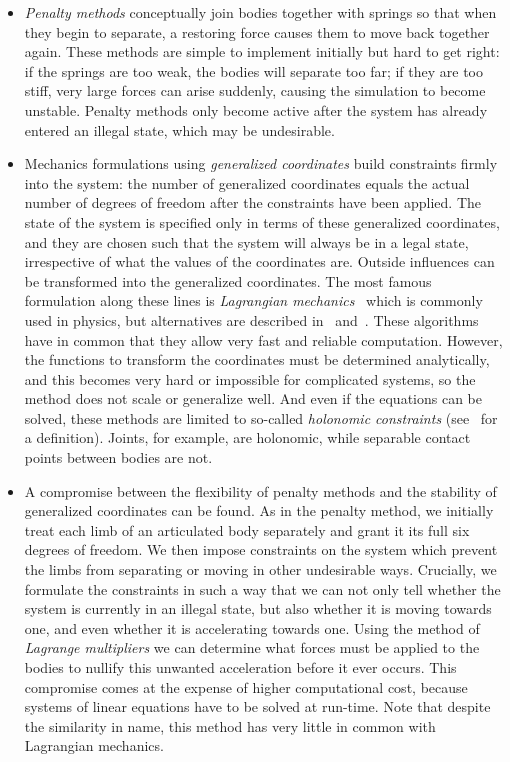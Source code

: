 \begin{itemize}
\item \emph{Penalty methods} conceptually join bodies together with springs so that when they
    begin to separate, a restoring force causes them to move back together again. These methods
    are simple to implement initially but hard to get right: if the springs are too weak, the
    bodies will separate too far; if they are too stiff, very large forces can arise suddenly,
    causing the simulation to become unstable. Penalty methods only become active after the
    system has already entered an illegal state, which may be undesirable.

\item Mechanics formulations using \emph{generalized coordinates} build constraints firmly into
    the system: the number of generalized coordinates equals the actual number of degrees of
    freedom after the constraints have been applied. The state of the system is specified only in
    terms of these generalized coordinates, and they are chosen such that the system will always
    be in a legal state, irrespective of what the values of the coordinates are. Outside
    influences can be transformed into the generalized coordinates. The most famous formulation
    along these lines is \emph{Lagrangian mechanics}~\cite{Hand:98,Goldstein:80} which is
    commonly used in physics, but alternatives are described in~\cite{Wilhelms:91}
    and~\cite{Featherstone:87}.
    These algorithms have in common that they allow very fast and reliable computation. However,
    the functions to transform the coordinates must be determined analytically, and this becomes
    very hard or impossible for complicated systems, so the method does not scale or generalize
    well. And even if the equations can be solved, these methods are limited to so-called
    \emph{holonomic constraints} (see~\cite{Hand:98} for a definition). Joints, for example,
    are holonomic, while separable contact points between bodies are not.

\item A compromise between the flexibility of penalty methods and the stability of generalized
    coordinates can be found. As in the penalty method, we initially treat each limb of an
    articulated body separately and grant it its full six degrees of freedom. We then impose
    constraints on the system which prevent the limbs from separating or moving in other
    undesirable ways. Crucially, we formulate the constraints in such a way that we can not only
    tell whether the system is currently in an illegal state, but also whether it is moving
    towards one, and even whether it is accelerating towards one. Using the method of
    \emph{Lagrange multipliers} we can determine what forces must be applied to the bodies to
    nullify this unwanted acceleration before it ever occurs. This compromise comes at the expense
    of higher computational cost, because systems of linear equations have to be solved at
    run-time. Note that despite the similarity in name, this method has very little in common with
    Lagrangian mechanics.
\end{itemize}

